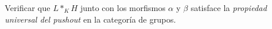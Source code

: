 \begin{ejercicio}
Verificar que $L{\ast}_{K} H$ junto con los morfismos $\alpha$ y $\beta$ satisface la \textit{propiedad universal del pushout} en la categoría de grupos.
\end{ejercicio}

\begin{demostracion}

\end{demostracion}
